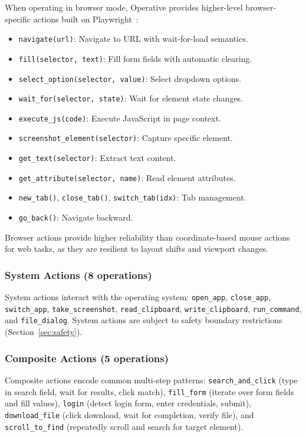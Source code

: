 When operating in browser mode, Operative provides higher-level browser-specific actions built on Playwright~\cite{playwright2024}:

\begin{itemize}[leftmargin=*]
    \item \texttt{navigate(url)}: Navigate to URL with wait-for-load semantics.
    \item \texttt{fill(selector, text)}: Fill form fields with automatic clearing.
    \item \texttt{select\_option(selector, value)}: Select dropdown options.
    \item \texttt{wait\_for(selector, state)}: Wait for element state changes.
    \item \texttt{execute\_js(code)}: Execute JavaScript in page context.
    \item \texttt{screenshot\_element(selector)}: Capture specific element.
    \item \texttt{get\_text(selector)}: Extract text content.
    \item \texttt{get\_attribute(selector, name)}: Read element attributes.
    \item \texttt{new\_tab()}, \texttt{close\_tab()}, \texttt{switch\_tab(idx)}: Tab management.
    \item \texttt{go\_back()}: Navigate backward.
\end{itemize}

Browser actions provide higher reliability than coordinate-based mouse actions for web tasks, as they are resilient to layout shifts and viewport changes.

\subsubsection{System Actions (8 operations)}

System actions interact with the operating system: \texttt{open\_app}, \texttt{close\_app}, \texttt{switch\_app}, \texttt{take\_screenshot}, \texttt{read\_clipboard}, \texttt{write\_clipboard}, \texttt{run\_command}, and \texttt{file\_dialog}. System actions are subject to safety boundary restrictions (Section~\ref{sec:safety}).

\subsubsection{Composite Actions (5 operations)}

Composite actions encode common multi-step patterns: \texttt{search\_and\_click} (type in search field, wait for results, click match), \texttt{fill\_form} (iterate over form fields and fill values), \texttt{login} (detect login form, enter credentials, submit), \texttt{download\_file} (click download, wait for completion, verify file), and \texttt{scroll\_to\_find} (repeatedly scroll and search for target element).

